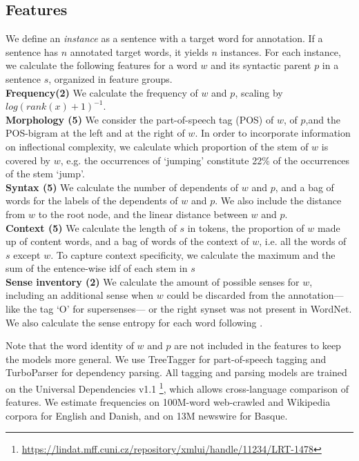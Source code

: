 \documentclass[11pt,a4paper]{article}
\begin{document}
\subsection{Features}
We define an \textit{instance} as a sentence with a target word for annotation. If a sentence has $n$ annotated target words, it yields $n$ instances. For each instance, we calculate the following features for a word $w$ and its syntactic parent $p$ in a sentence $s$, organized in feature groups.\\ 
\noindent\textbf{Frequency(2)} We calculate the frequency of $w$ and $p$, scaling by $log(rank(x)+1)^{-1}$.\\
\textbf{ Morphology (5)} We consider the part-of-speech tag (POS) of $w$, of $p$,and the POS-bigram at the left and at the right of $w$. In order to incorporate information on inflectional complexity, we calculate which proportion of the stem of $w$ is covered by $w$, e.g. the occurrences of `jumping' constitute 22\% of the occurrences of the stem `jump'. \\
\textbf{Syntax (5)} We calculate the number of dependents of $w$ and $p$, and a bag of words for the labels of the dependents of $w$ and $p$. We also include the distance from $w$ to the root node, and the linear distance between $w$ and $p$.\\
\textbf{ Context  (5)} We calculate the length of $s$ in tokens, the proportion of $w$ made up of content words, and a bag of words of the context of $w$, i.e. all the words of $s$ except $w$. To capture context specificity, we calculate the maximum and the sum of the entence-wise idf of each stem in $s$ \\
\textbf{Sense inventory (2)} We calculate the amount of possible senses for $w$, including an additional sense when $w$ could be discarded from the annotation---like the tag `O' for supersenses--- or the right synset was not present in WordNet. We also calculate the sense entropy for each word following . 

Note that the word identity of $w$ and $p$ are not included in the features to keep the models more general. We use TreeTagger \cite{Schmid1994} for part-of-speech tagging and TurboParser \cite{Martins2010} for dependency parsing. All tagging and parsing models are trained on the Universal Dependencies v1.1 \footnote{\url{https://lindat.mff.cuni.cz/repository/xmlui/handle/11234/LRT-1478}}, which allows cross-language comparison of features. We estimate frequencies on 100M-word web-crawled and Wikipedia corpora for English and Danish, and on 13M newswire for Basque.
\end{document}
